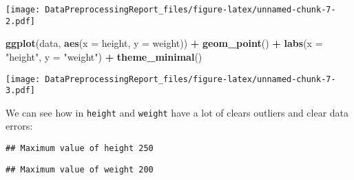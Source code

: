 \documentclass[
]{article}
\newenvironment{Shaded}{\begin{snugshade}}{\end{snugshade}}
\newcommand{\AttributeTok}[1]{\textcolor[rgb]{0.13,0.29,0.53}{#1}}
\newcommand{\FunctionTok}[1]{\textcolor[rgb]{0.13,0.29,0.53}{\textbf{#1}}}
\newcommand{\NormalTok}[1]{#1}
\newcommand{\SpecialCharTok}[1]{\textcolor[rgb]{0.81,0.36,0.00}{\textbf{#1}}}
\newcommand{\StringTok}[1]{\textcolor[rgb]{0.31,0.60,0.02}{#1}}
\begin{document}
\texttt{[image: DataPreprocessingReport\_files/figure-latex/unnamed-chunk-7-2.pdf]}

\begin{Shaded}
\begin{Highlighting}[]
\FunctionTok{ggplot}\NormalTok{(data, }\FunctionTok{aes}\NormalTok{(}\AttributeTok{x =}\NormalTok{ height, }\AttributeTok{y =}\NormalTok{ weight)) }\SpecialCharTok{+}
  \FunctionTok{geom\_point}\NormalTok{() }\SpecialCharTok{+}
  \FunctionTok{labs}\NormalTok{(}\AttributeTok{x =} \StringTok{"height"}\NormalTok{, }\AttributeTok{y =} \StringTok{"weight"}\NormalTok{) }\SpecialCharTok{+}
  \FunctionTok{theme\_minimal}\NormalTok{()}
\end{Highlighting}
\end{Shaded}

\texttt{[image: DataPreprocessingReport\_files/figure-latex/unnamed-chunk-7-3.pdf]}

We can see how in \texttt{height} and \texttt{weight} have a lot of
clears outliers and clear data errors:

\begin{Shaded}
\end{Shaded}

\begin{verbatim}
## Maximum value of height 250
\end{verbatim}

\begin{Shaded}
\end{Shaded}

\begin{verbatim}
## Maximum value of weight 200
\end{verbatim}

\begin{Shaded}
\end{Shaded}
\end{document}
